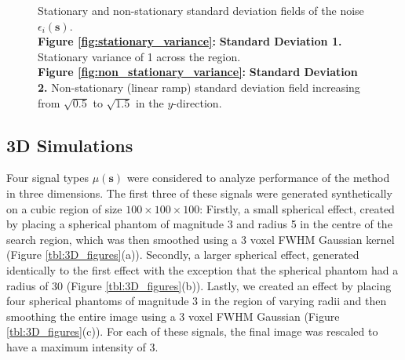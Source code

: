 \begin{figure}[htbp]
\label{fig:2D_variances}
\centering
{}
\caption{Stationary and non-stationary standard deviation fields of the noise $\epsilon_{i}(\bm{s})$. \\ \textbf{Figure \ref{fig:stationary_variance}:} \textbf{Standard Deviation 1.} Stationary variance of 1 across the region. \\ \textbf{Figure \ref{fig:non_stationary_variance}:} \textbf{Standard Deviation 2.} Non-stationary (linear ramp) standard deviation field increasing from $\sqrt{0.5}$ to $\sqrt{1.5}$ in the $y$-direction.}
\end{figure}

\subsection{3D Simulations}
\label{sec:3D_simulations}

Four signal types $\mu(\bm{s})$ were considered to analyze performance of the method in three dimensions. The first three of these signals were generated synthetically on a cubic region of size $100 \times 100 \times 100$: Firstly, a small spherical effect, created by placing a spherical phantom of magnitude 3 and radius 5 in the centre of the search region, which was then smoothed using a 3 voxel FWHM Gaussian kernel (Figure \ref{tbl:3D_figures}(a)). Secondly, a larger spherical effect, generated identically to the first effect with the exception that the spherical phantom had a radius of 30 (Figure \ref{tbl:3D_figures}(b)). Lastly, we created an effect by placing four spherical phantoms of magnitude 3 in the region of varying radii and then smoothing the entire image using a 3 voxel FWHM Gaussian (Figure \ref{tbl:3D_figures}(c)). For each of these signals, the final image was rescaled to have a maximum intensity of 3.

